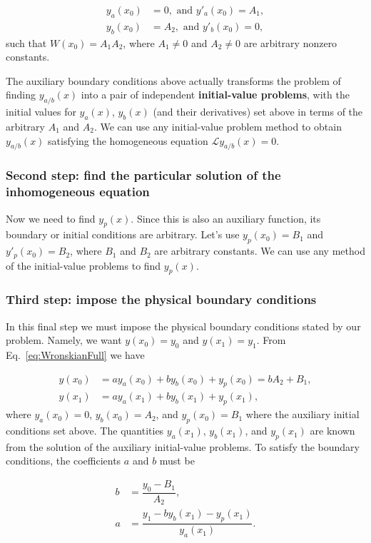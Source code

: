 \begin{align}
 y_a(x_0) &= 0, \text{  and  } y'_a(x_0) = A_1,\\
 y_b(x_0) &= A_2, \text{  and  } y'_b(x_0) = 0,
\end{align}
such that $W(x_0) = A_1 A_2$, where $A_1 \neq 0$ and $A_2 \neq 0$ are arbitrary nonzero constants.

The auxiliary boundary conditions above actually transforms the problem of finding $y_{a/b}(x)$ into a pair of independent \textbf{initial-value problems}, with the initial values for $y_a(x)$, $y_b(x)$ (and their derivatives) set above in terms of the arbitrary $A_1$ and $A_2$. We can use any initial-value problem method to obtain $y_{a/b}(x)$ satisfying the homogeneous equation $\mathcal{L}y_{a/b}(x) = 0$.

\subsubsection{Second step: find the particular solution of the inhomogeneous equation}

Now we need to find $y_p(x)$. Since this is also an auxiliary function, its boundary or initial conditions are arbitrary. Let's use $y_p(x_0) = B_1$ and $y'_p(x_0) = B_2$, where $B_1$ and $B_2$ are arbitrary constants. We can use any method of the initial-value problems to find $y_p(x)$.

\subsubsection{Third step: impose the physical boundary conditions}

In this final step we must impose the physical boundary conditions stated by our problem. Namely, we want $y(x_0) = y_0$ and $y(x_1) = y_1$. From Eq.~\eqref{eq:WronskianFull} we have

\begin{align}
 y(x_0) &= a y_a(x_0) + b y_b(x_0) + y_p(x_0) = b A_2 + B_1,\\
 y(x_1) &= a y_a(x_1) + b y_b(x_1) + y_p(x_1),
\end{align}
where $y_a(x_0) = 0$, $y_b(x_0) = A_2$, and $y_p(x_0) = B_1$ where the auxiliary initial conditions set above. The quantities $y_a(x_1)$, $y_b(x_1)$, and $y_p(x_1)$ are known from the solution of the auxiliary initial-value problems. To satisfy the boundary conditions, the coefficients $a$ and $b$ must be

\begin{align}
 b &= \dfrac{y_0-B_1}{A_2},\\
 a &= \dfrac{y_1 - b y_b(x_1) - y_p(x_1)}{y_a(x_1)}.
\end{align}

